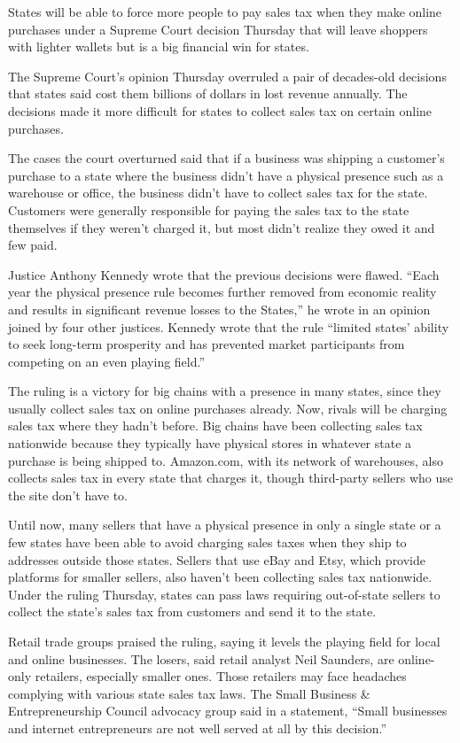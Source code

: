 States will be able to force more people to pay sales tax when they make online purchases under a Supreme Court decision Thursday that will leave shoppers with lighter wallets but is a big financial win for states.


The Supreme Court's opinion Thursday overruled a pair of decades-old decisions that states said cost them billions of dollars in lost revenue annually. The decisions made it more difficult for states to collect sales tax on certain online purchases.


The cases the court overturned said that if a business was shipping a customer's purchase to a state where the business didn't have a physical presence such as a warehouse or office, the business didn't have to collect sales tax for the state. Customers were generally responsible for paying the sales tax to the state themselves if they weren't charged it, but most didn't realize they owed it and few paid.


Justice Anthony Kennedy wrote that the previous decisions were flawed. ``Each year the physical presence rule becomes further removed from economic reality and results in significant revenue losses to the States,'' he wrote in an opinion joined by four other justices. Kennedy wrote that the rule ``limited states' ability to seek long-term prosperity and has prevented market participants from competing on an even playing field.''


The ruling is a victory for big chains with a presence in many states, since they usually collect sales tax on online purchases already. Now, rivals will be charging sales tax where they hadn't before. Big chains have been collecting sales tax nationwide because they typically have physical stores in whatever state a purchase is being shipped to. Amazon.com, with its network of warehouses, also collects sales tax in every state that charges it, though third-party sellers who use the site don't have  to.


Until now, many sellers that have a physical presence in only a single state or a few states have been able to avoid charging sales taxes when they ship to addresses outside those states. Sellers that use eBay and Etsy, which provide platforms for smaller sellers, also haven't been collecting sales tax nationwide. Under the ruling Thursday, states can pass laws requiring out-of-state sellers to collect the state's sales tax from customers and send it to the state.


Retail trade groups praised the ruling, saying it levels the playing field for local and online businesses. The losers, said retail analyst Neil Saunders, are online-only retailers, especially smaller ones. Those retailers may face headaches complying with various state sales tax laws. The Small Business \& Entrepreneurship Council advocacy group said in a statement, ``Small businesses and internet entrepreneurs are not well served at all by this decision.''